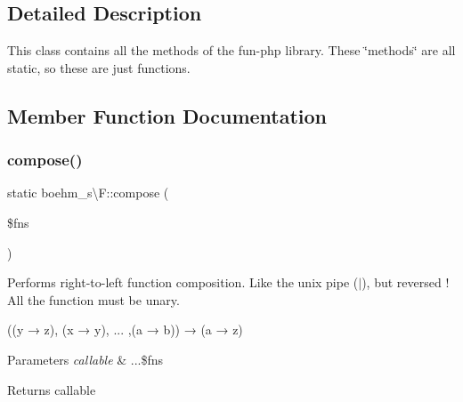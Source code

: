 \subsection{Detailed Description}
This class contains all the methods of the fun-\/php library. These \char`\"{}methods\char`\"{} are all static, so these are just functions. 

\subsection{Member Function Documentation}
\mbox{\label{classboehm__s_1_1F_a1712c41e5be41e6f6e2088ed5d54a864}} 
\subsubsection{\texorpdfstring{compose()}{compose()}}
{\footnotesize\ttfamily static boehm\+\_\+s\textbackslash{}\+F\+::compose (\begin{DoxyParamCaption}\item[{}]{\$fns }\end{DoxyParamCaption})\hspace{0.3cm}{\ttfamily [static]}}

Performs right-\/to-\/left function composition. Like the unix pipe ($\vert$), but reversed ! All the function must be unary.


\begin{DoxyCode}
((y → z), (x → y), ... ,(a → b)) → (a → z) 
\end{DoxyCode}
 
 
\begin{DoxyParams}{Parameters}
{\em callable} & ...\$fns \\
\hline
\end{DoxyParams}
\begin{DoxyReturn}{Returns}
callable 
\end{DoxyReturn}
\mbox{\label{classboehm__s_1_1F_adf594aee11edbf796efae99d00dc8f46}} 
